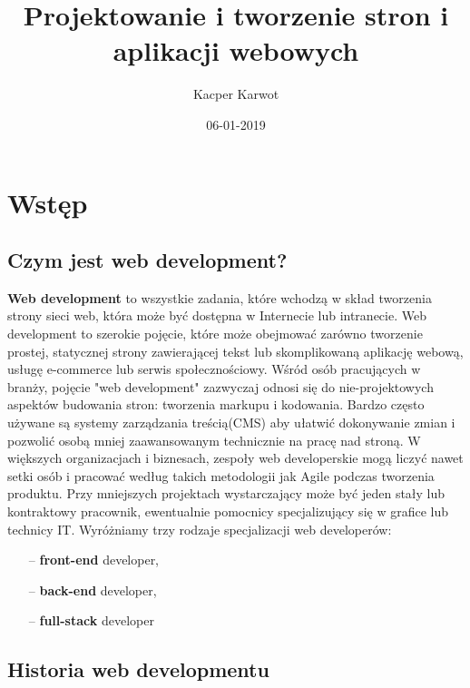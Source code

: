 \documentclass[12pt]{report}
\title{Projektowanie i tworzenie stron i aplikacji webowych}
\date{06-01-2019}
\author{Kacper Karwot}
\begin{document}
	\maketitle
	\newpage
	\chapter{Wstęp}
	\section{Czym jest web development?}
	\textbf{Web development} to wszystkie zadania, które wchodzą w skład tworzenia strony sieci web, która może być dostępna w Internecie lub intranecie. 
	Web development to szerokie pojęcie, które może obejmować zarówno tworzenie prostej, statycznej strony zawierającej tekst lub 			skomplikowaną aplikację webową, usługę e-commerce lub serwis społecznościowy. 
 Wśród osób pracujących w branży, pojęcie "web development" zazwyczaj odnosi się do nie-projektowych aspektów budowania stron: tworzenia markupu i kodowania. Bardzo często używane są systemy zarządzania treścią(CMS) aby ułatwić dokonywanie zmian i pozwolić osobą mniej zaawansowanym technicznie na pracę nad stroną.
 	\newline
 	W większych organizacjach i biznesach, zespoły web developerskie mogą liczyć nawet setki osób i pracować według takich metodologii jak Agile podczas tworzenia produktu. Przy mniejszych projektach wystarczający może być jeden stały lub kontraktowy pracownik, ewentualnie pomocnicy specjalizujący się w grafice lub technicy IT. 
	\newline
	Wyróżniamy trzy rodzaje specjalizacji web developerów:
	\begin{itemize}
	\item[--] \textbf{front-end} developer,
	\item[--] \textbf{back-end} developer,
	\item[--] \textbf{full-stack} developer
 	\end{itemize}
 	
 	\cite{wiki:1}
 	
 	
 	\newpage
	\section{Historia web developmentu}
	
\end{document}
